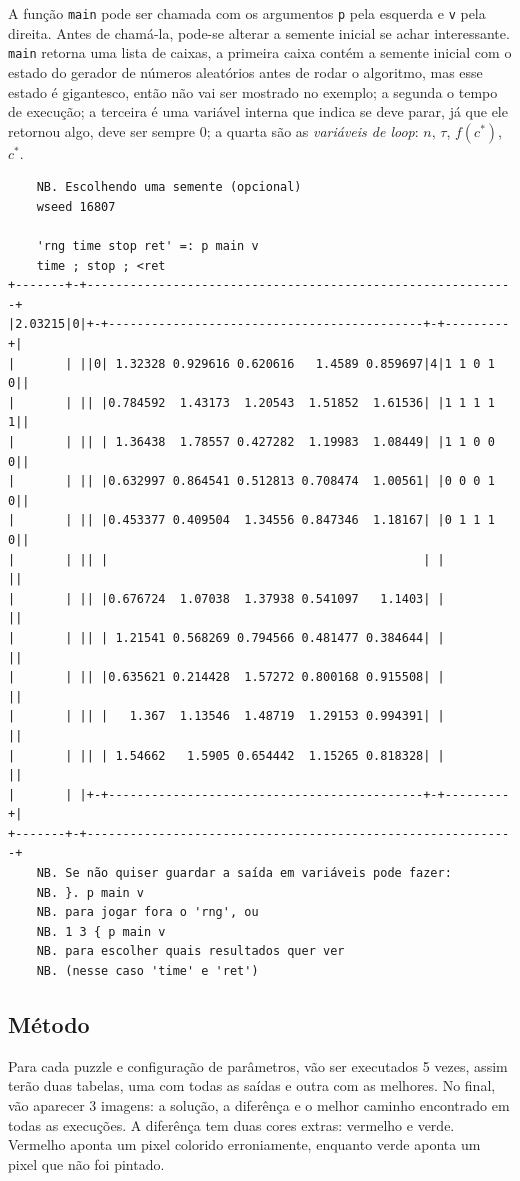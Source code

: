 \documentclass{article}
\newcommand{\inlcode}{\texttt}
\begin{document}
A função \inlcode{main} pode ser chamada com os argumentos
\inlcode{p} pela esquerda e \inlcode{v} pela direita.
Antes de chamá-la, pode-se alterar a semente inicial
se achar interessante.
\inlcode{main} retorna uma lista de caixas,
a primeira caixa contém a semente inicial
com o estado do gerador de números aleatórios
antes de rodar o algoritmo,
mas esse estado é gigantesco,
então não vai ser mostrado no exemplo;
a segunda o tempo de execução;
a terceira é uma variável interna que indica se deve parar,
já que ele retornou algo, deve ser sempre \(0\);
a quarta são as \emph{variáveis de loop}:
\(n\), \(\tau\), \(f(c^*)\), \(c^*\).
\begin{verbatim}
    NB. Escolhendo uma semente (opcional)
    wseed 16807

    'rng time stop ret' =: p main v
    time ; stop ; <ret
+-------+-+------------------------------------------------------------+
|2.03215|0|+-+--------------------------------------------+-+---------+|
|       | ||0| 1.32328 0.929616 0.620616   1.4589 0.859697|4|1 1 0 1 0||
|       | || |0.784592  1.43173  1.20543  1.51852  1.61536| |1 1 1 1 1||
|       | || | 1.36438  1.78557 0.427282  1.19983  1.08449| |1 1 0 0 0||
|       | || |0.632997 0.864541 0.512813 0.708474  1.00561| |0 0 0 1 0||
|       | || |0.453377 0.409504  1.34556 0.847346  1.18167| |0 1 1 1 0||
|       | || |                                            | |         ||
|       | || |0.676724  1.07038  1.37938 0.541097   1.1403| |         ||
|       | || | 1.21541 0.568269 0.794566 0.481477 0.384644| |         ||
|       | || |0.635621 0.214428  1.57272 0.800168 0.915508| |         ||
|       | || |   1.367  1.13546  1.48719  1.29153 0.994391| |         ||
|       | || | 1.54662   1.5905 0.654442  1.15265 0.818328| |         ||
|       | |+-+--------------------------------------------+-+---------+|
+-------+-+------------------------------------------------------------+
    NB. Se não quiser guardar a saída em variáveis pode fazer:
    NB. }. p main v
    NB. para jogar fora o 'rng', ou
    NB. 1 3 { p main v
    NB. para escolher quais resultados quer ver
    NB. (nesse caso 'time' e 'ret')
\end{verbatim}

\subsection{Método}

Para cada puzzle e configuração de parâmetros,
vão ser executados 5 vezes,
assim terão duas tabelas,
uma com todas as saídas e
outra com as melhores.
No final, vão aparecer 3 imagens:
a solução, a diferênça e
o melhor caminho encontrado em todas as execuções.
A diferênça tem duas cores extras: vermelho e verde.
Vermelho aponta um pixel colorido erroniamente,
enquanto verde aponta um pixel que não foi pintado.
\end{document}
